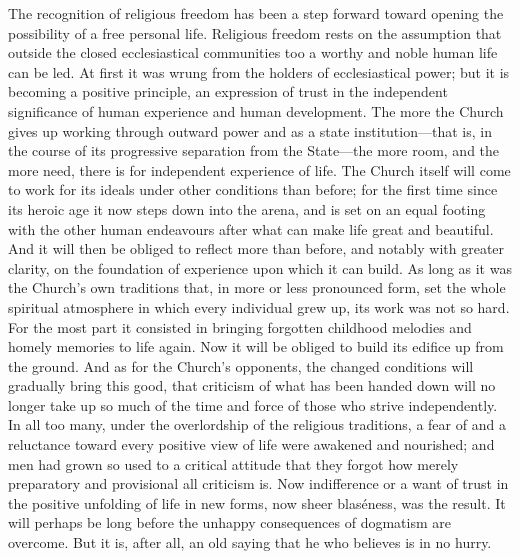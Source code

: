 \documentclass[12pt,a4paper]{article}
\newcommand{\opage}[1]{\marginnote{\footnotesize\textit{[#1]}}}
\begin{document}
The recognition of religious freedom has been a step forward toward opening the
possibility of a free personal life. Religious freedom rests on the assumption that
outside the closed ecclesiastical communities too a worthy and noble human life can be
led. At first it was wrung from the holders of ecclesiastical power; but it is becoming
a positive principle, an expression of trust in the independent significance of human
experience and human development. The more the Church gives up working through outward
power and as a state institution---that is, in the course of its progressive separation
from the State---the more room, and the more need, there is for independent experience
of life. The Church itself will come to work for its ideals under other conditions than
before; for the first time since its heroic age it now steps down into the arena, and
is set on an equal footing with the other human endeavours after what can make life
great and beautiful. And it will then be obliged to reflect \opage{58}more than before, and
notably with greater clarity, on the foundation of experience upon which it can build.
As long as it was the Church's own traditions that, in more or less pronounced form,
set the whole spiritual atmosphere in which every individual grew up, its work was not
so hard. For the most part it consisted in bringing forgotten childhood melodies and
homely memories to life again. Now it will be obliged to build its edifice up from the
ground. And as for the Church's opponents, the changed conditions will gradually bring
this good, that criticism of what has been handed down will no longer take up so much
of the time and force of those who strive independently. In all too many, under the
overlordship of the religious traditions, a fear of and a reluctance toward every
positive view of life were awakened and nourished; and men had grown so used to a
critical attitude that they forgot how merely preparatory and provisional all criticism
is. Now indifference or a want of trust in the positive unfolding of life in new forms,
now sheer blaséness, was the result. It will perhaps be long before the unhappy
consequences of dogmatism are overcome. But it is, after all, an old saying that he who
believes is in no hurry.
\end{document}
